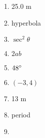 \documentclass[../uilmath.tex]{subfiles}
\begin{document}
\begin{enumerate}[label=\bfseries\arabic*.]
    \item %
    25.0 m 

    \item %
    hyperbola 

    \item %
    $\sec^2 \theta$

    \item %
    $2ab$

    \item %
    $48\degree$

    \item %
    $(-3,4)$

    \item %
    13 m 

    \item %
    period 

    \item %
    
\end{enumerate}
\end{document}
